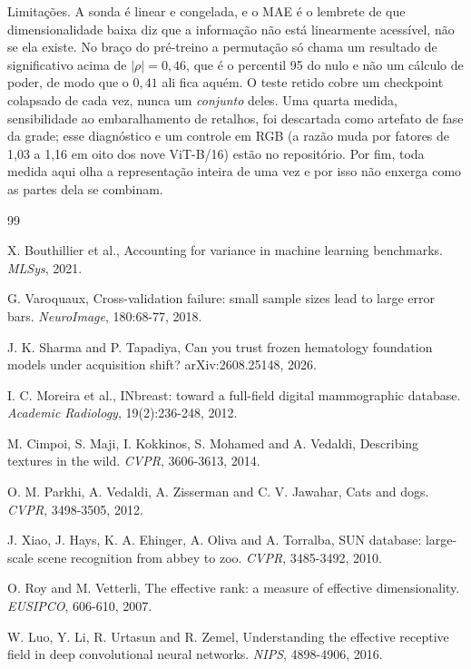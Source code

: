 \documentclass{esannV2}
\begin{document}
Limitações. A sonda é linear e congelada, e o MAE é o lembrete de que
dimensionalidade baixa diz que a informação não está linearmente acessível, não
se ela existe. No braço do pré-treino a permutação só chama um resultado de
significativo acima de $|\rho| = 0{,}46$, que é o percentil 95 do nulo e não um
cálculo de poder, de modo que o $0{,}41$ ali fica aquém. O teste retido
cobre um checkpoint colapsado de cada vez, nunca um \emph{conjunto} deles. Uma quarta
medida, sensibilidade ao embaralhamento de retalhos, foi descartada como
artefato de fase da grade; esse diagnóstico e um controle em RGB (a razão muda
por fatores de 1,03 a 1,16 em oito dos nove ViT-B/16) estão no repositório.
Por fim, toda medida aqui olha a representação inteira de uma vez e por isso
não enxerga como as partes dela se combinam.

\begin{footnotesize}
\begin{thebibliography}{99}

 X. Bouthillier et al., Accounting for variance in machine learning benchmarks. \emph{MLSys}, 2021.

 G. Varoquaux, Cross-validation failure: small sample sizes lead to large error bars. \emph{NeuroImage}, 180:68-77, 2018.

 J. K. Sharma and P. Tapadiya, Can you trust frozen hematology foundation models under acquisition shift? arXiv:2608.25148, 2026.

 I. C. Moreira et al., INbreast: toward a full-field digital mammographic database. \emph{Academic Radiology}, 19(2):236-248, 2012.

 M. Cimpoi, S. Maji, I. Kokkinos, S. Mohamed and A. Vedaldi, Describing textures in the wild. \emph{CVPR}, 3606-3613, 2014.

 O. M. Parkhi, A. Vedaldi, A. Zisserman and C. V. Jawahar, Cats and dogs. \emph{CVPR}, 3498-3505, 2012.

 J. Xiao, J. Hays, K. A. Ehinger, A. Oliva and A. Torralba, SUN database: large-scale scene recognition from abbey to zoo. \emph{CVPR}, 3485-3492, 2010.

 O. Roy and M. Vetterli, The effective rank: a measure of effective dimensionality. \emph{EUSIPCO}, 606-610, 2007.

 W. Luo, Y. Li, R. Urtasun and R. Zemel, Understanding the effective receptive field in deep convolutional neural networks. \emph{NIPS}, 4898-4906, 2016.


\end{thebibliography}
\end{footnotesize}
\end{document}
